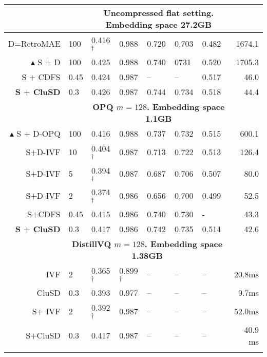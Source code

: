 \begin{table*}[htbp]
{\begin{tabular}{  r| l  |llll l|r}
    \multicolumn{2}{c}{}
  & \multicolumn{5}{c}{\bf{Uncompressed flat setting. Embedding space  27.2GB}}\\
     \hline
 D=RetroMAE  & 100 
& 0.416$^\dag$& 0.988& 0.720&0.703& 0.482 & 1674.1 \\
$\blacktriangle$ S $+$ D   &100 
& 0.425& 0.988& 0.740&0731& 0.520~&  1705.3 \\
  S $+$ CDFS &0.45
& 0.424& 0.987& --&-- & 0.517 & 46.0 \\
  {\bf S $+$ CluSD} &0.3
& 0.426& 0.987& 0.744&0.734 & 0.518 & 44.4 \\
              \hline
    \multicolumn{2}{c}{} &
\multicolumn{5}{c}{\bf{OPQ $m=128$. Embedding space  1.1GB}}\\
              \hline
 $\blacktriangle$  S $+$ D-OPQ &100 
& 0.416 & 0.988 & 0.737 & 0.732 & 0.515& 600.1 \\
S$+$D-IVF &10
& 0.404$^\dag$& 0.987& 0.713&0.722& 0.513 &  126.4 \\
S$+$D-IVF 
&5
& 0.394$^\dag$& 0.987& 0.687&0.706&0.507&  80.0 \\
S$+$D-IVF 
&2
& 0.374$^\dag$& 0.986 & 0.656&0.700& 0.499 & 52.5 \\
            S$+$CDFS  &0.45& 0.415 & 0.986 & 0.740& 0.730 &- & 43.3 \\
 \textbf{S $+$ CluSD}  &0.3
& 0.417& 0.986& 0.742&0.735& 0.514  & 42.6  \\
             \hline
\comments{
    \multicolumn{2}{c}{} &
             \multicolumn{6}{c}{\bf{DistillVQ $m=128$. Embedding space  1.38GB}}\\
\hline
IVF  & 2  & 0.365$^\dag$ &     0.899$^\dag$ &  --& -- & -- &  20.8ms\\
CluSD & 0.3 & 0.393 &  0.977&  --&  -- & --&  9.7ms\\
S+ IVF & 2    &0.392$^\dag$ & 0.987&--&  -- & --&   52.0ms\\
S+CluSD &0.3 &   0.417 &        0.987 & --& -- & -- & 40.9 ms\\
\hline

}
\end{tabular}}
\end{table*}
